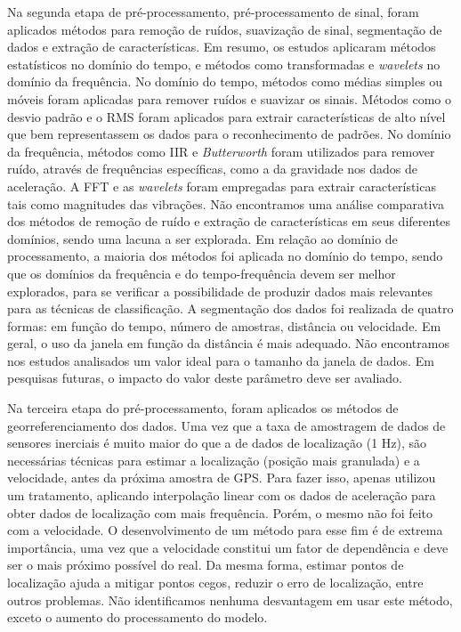 Na segunda etapa de pré-processamento, pré-processamento de sinal, foram aplicados métodos para remoção de ruídos, suavização de sinal, segmentação de dados e extração de características. Em resumo, os estudos aplicaram métodos estatísticos no domínio do tempo, e métodos como transformadas e \textit{wavelets} no domínio da frequência. No domínio do tempo, métodos como médias simples ou móveis foram aplicadas para remover ruídos e suavizar os sinais. Métodos como o desvio padrão e o RMS foram aplicados para extrair características de alto nível que bem representassem os dados para o reconhecimento de padrões. No domínio da frequência, métodos como IIR e \textit{Butterworth} foram utilizados para remover ruído, através de frequências específicas, como a da gravidade nos dados de aceleração. A FFT e as \textit{wavelets} foram empregadas para extrair características tais como magnitudes das vibrações. Não encontramos uma análise comparativa dos métodos de remoção de ruído e extração de características em seus diferentes domínios, sendo uma lacuna a ser explorada. Em relação ao domínio de processamento, a maioria dos métodos foi aplicada no domínio do tempo, sendo que os domínios da frequência e do tempo-frequência devem ser melhor explorados, para se verificar a possibilidade de produzir dados mais relevantes para as técnicas de classificação. A segmentação dos dados foi realizada de quatro formas: em função do tempo, número de amostras, distância ou velocidade. Em geral, o uso da janela em função da distância é mais adequado. Não encontramos nos estudos analisados um valor ideal para o tamanho da janela de dados. Em pesquisas futuras, o impacto do valor deste parâmetro deve ser avaliado.

Na terceira etapa do pré-processamento, foram aplicados os métodos de georreferenciamento dos dados. Uma vez que a taxa de amostragem de dados de sensores inerciais é muito maior do que a de dados de localização (1 Hz), são necessárias técnicas para estimar a localização (posição mais granulada) e a velocidade, antes da próxima amostra de GPS. Para fazer isso, apenas \cite{Li2018} utilizou um tratamento, aplicando interpolação linear com os dados de aceleração para obter dados de localização com mais frequência. Porém, o mesmo não foi feito com a velocidade. O desenvolvimento de um método para esse fim é de extrema importância, uma vez que a velocidade constitui um fator de dependência e deve ser o mais próximo possível do real. Da mesma forma, estimar pontos de localização ajuda a mitigar pontos cegos, reduzir o erro de localização, entre outros problemas. Não identificamos nenhuma desvantagem em usar este método, exceto o aumento do processamento do modelo.

